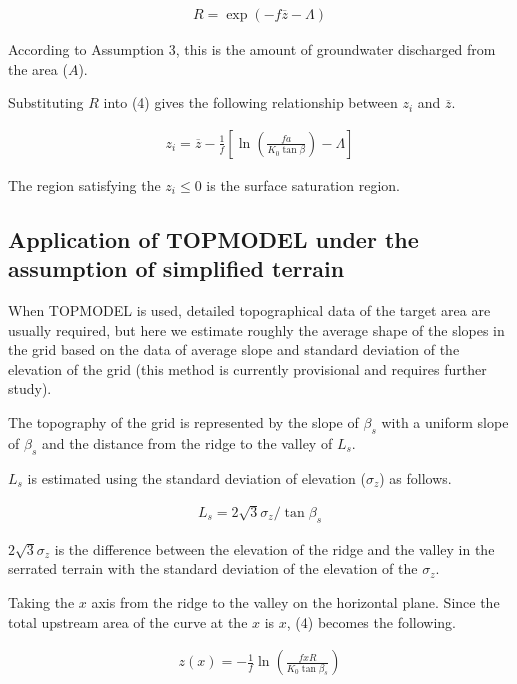 \begin{eqnarray}
 R = \exp (-f \overline{z} -\Lambda)
\end{eqnarray}

According to Assumption 3, this is the amount of groundwater discharged
from the area (\(A\)).

Substituting \(R\) into (4) gives the following relationship between
\(z_i\) and \(\overline{z}\).

\begin{eqnarray}
 z_i = \overline{z} - \frac{1}{f} \left[
\ln \left( \frac{fa}{K_0 \tan \beta}\right) - \Lambda
\right]
\end{eqnarray}

The region satisfying the \(z_i \leq 0\) is the surface saturation
region.

\hypertarget{application-of-topmodel-under-the-assumption-of-simplified-terrain}{%
\subsection{Application of TOPMODEL under the assumption of simplified
terrain}\label{application-of-topmodel-under-the-assumption-of-simplified-terrain}}

When TOPMODEL is used, detailed topographical data of the target area
are usually required, but here we estimate roughly the average shape of
the slopes in the grid based on the data of average slope and standard
deviation of the elevation of the grid (this method is currently
provisional and requires further study).

The topography of the grid is represented by the slope of \(\beta_s\)
with a uniform slope of \(\beta_s\) and the distance from the ridge to
the valley of \(L_s\).

\(L_s\) is estimated using the standard deviation of elevation
(\(\sigma_z\)) as follows.

\begin{eqnarray}
 L_s = 2\sqrt{3} \sigma_z / \tan\beta_s
\end{eqnarray}

\(2\sqrt{3}\sigma_z\) is the difference between the elevation of the
ridge and the valley in the serrated terrain with the standard deviation
of the elevation of the \(\sigma_z\).

Taking the \(x\) axis from the ridge to the valley on the horizontal
plane. Since the total upstream area of the curve at the \(x\) is \(x\),
(4) becomes the following.

\begin{eqnarray}
 z(x) = - \frac{1}{f} \ln \left( \frac{fxR}{K_0 \tan \beta_s}\right)
\end{eqnarray}

